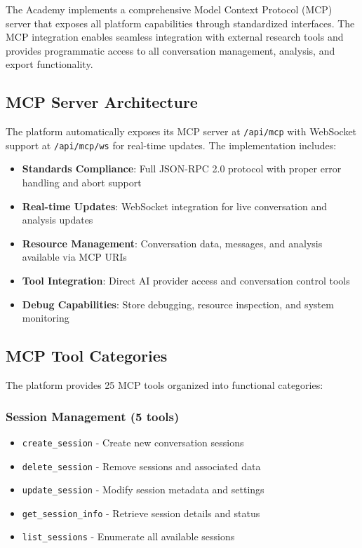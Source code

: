 \documentclass[11pt,letterpaper]{article}
\newcommand{\theacademy}{The Academy}
\begin{document}
\theacademy{} implements a comprehensive Model Context Protocol (MCP) server that exposes all platform capabilities through standardized interfaces. The MCP integration enables seamless integration with external research tools and provides programmatic access to all conversation management, analysis, and export functionality.

\subsection{MCP Server Architecture}

The platform automatically exposes its MCP server at \texttt{/api/mcp} with WebSocket support at \texttt{/api/mcp/ws} for real-time updates. The implementation includes:

\begin{itemize}
    \item \textbf{Standards Compliance}: Full JSON-RPC 2.0 protocol with proper error handling and abort support
    \item \textbf{Real-time Updates}: WebSocket integration for live conversation and analysis updates
    \item \textbf{Resource Management}: Conversation data, messages, and analysis available via MCP URIs
    \item \textbf{Tool Integration}: Direct AI provider access and conversation control tools
    \item \textbf{Debug Capabilities}: Store debugging, resource inspection, and system monitoring
\end{itemize}

\subsection{MCP Tool Categories}

The platform provides 25 MCP tools organized into functional categories:

\subsubsection{Session Management (5 tools)}
\begin{itemize}
    \item \texttt{create\_session} - Create new conversation sessions
    \item \texttt{delete\_session} - Remove sessions and associated data
    \item \texttt{update\_session} - Modify session metadata and settings
    \item \texttt{get\_session\_info} - Retrieve session details and status
    \item \texttt{list\_sessions} - Enumerate all available sessions
\end{itemize}
\end{document}

